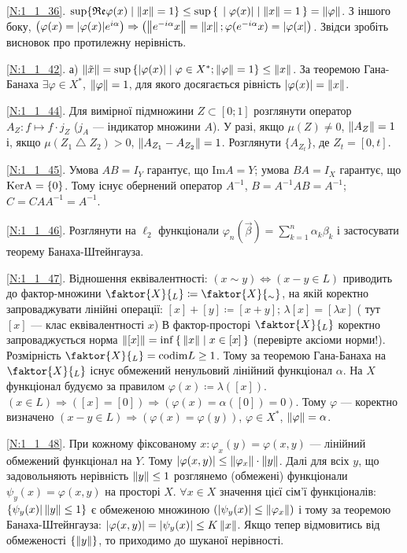 \noindent\ref{N:1_1_36}. $\sup\{\mathfrak{Re}\varphi(x) \mid \left\lVert x\right\rVert = 1\} \leq
\sup\set{ |\varphi(x)| \mid \left\lVert x\right\rVert=1 } = \left\lVert\varphi\right\rVert$.
З іншого боку, $\left(\varphi(x) = |\varphi(x)| e^{i \alpha}\right) \Rightarrow
\left( \left\lVert e^{-i \alpha}x\right\rVert = \left\lVert x\right\rVert; \varphi(e^{-i \alpha} x) = |\varphi(x| \right)$.
Звідси зробіть висновок про протилежну нерівність.

\noindent\ref{N:1_1_42}. а) $\left\lVert\tilde{x}\right\rVert = \sup\left\{|\varphi(x)| \mid
\varphi\in X^*; \left\lVert\varphi\right\rVert=1\right\} \leq \left\lVert x\right\rVert$. За теоремою Гана-Банаха 
$\exists\varphi\in X^*$, $\left\lVert\varphi\right\rVert = 1$, для якого досягається рівність
$|\varphi(x)| = \left\lVert x\right\rVert$.

\noindent\ref{N:1_1_44}. Для вимірної підмножини $Z \subset [0; 1]$ розглянути оператор
$A_Z: f \mapsto f \cdot j_Z$ ($j_A$ --- індикатор множини $A$). У разі, якщо $\mu(Z) \neq 0$, 
$\left\lVert A_Z\right\rVert = 1$ і, якщо $\mu (Z_1 \bigtriangleup Z_2) > 0$, $\left\lVert A_{Z_1} - A_{Z_2}\right\rVert = 1$.
Розглянути $\{A_{Z_t}\}$, де $Z_t = [0, t]$.

\noindent\ref{N:1_1_45}. Умова $AB = I_Y$ гарантує, що $\mathrm{Im} A = Y$; умова $BA = I_X$
гарантує, що $\rm KerA = \{0\}$. Тому існує обернений оператор $A^{-1}$, $B = A^{-1}AB = A^{-1}$; $C = CAA^{-1} = A^{-1}$.

\noindent\ref{N:1_1_46}. Розглянути на $\ell_2$ функціонали $\varphi_n (\vec{\beta}) = \sum\limits_{k = 1}^{n} \alpha_k \beta_k$
і застосувати теорему Банаха-Штейнгауза.

\noindent\ref{N:1_1_47}. Відношення еквівалентності: $(x \sim y) \Leftrightarrow (x - y \in L)$
приводить до фактор-множини $\faktor{X}{_L} \coloneqq \faktor{X}{_\sim}$, на якій коректно запроваджувати
лінійні операції: $[x] + [y] \coloneqq [x+y]$; $\lambda [x] = [\lambda x]$ ( тут $[x]$ --- клас еквівалентності $x$)
В фактор-просторі $\faktor{X}{_L}$ коректно запроваджується норма $\left\lVert[x]\right\rVert = \inf\set{\left\lVert x\right\rVert \mid x \in [x]}$
(перевірте аксіоми норми!). Розмірність $\faktor{X}{_L} = \mathrm{codim} L \geq 1$. Тому за теоремою
Гана-Банаха на $\faktor{X}{_L}$ існує обмежений ненульовий лінійний функціонал $\alpha$.
На $X$ функціонал будуємо за правилом $\varphi(x) \coloneqq \lambda([x])$.
$(x \in L) \Rightarrow ([x] = [0]) \Rightarrow (\varphi(x) = \alpha([0]) = 0)$.
Тому $\varphi$ --- коректно визначено $(x-y \in L) \Rightarrow (\varphi(x) = \varphi(y))$,
$\varphi \in X^*$, $\left\lVert\varphi\right\rVert = \alpha$.

\noindent\ref{N:1_1_48}. При кожному фіксованому $x: \varphi_x(y) = \varphi(x, y)$ --- лінійний обмежений функціонал на $Y$. Тому
$|\varphi(x, y)| \leq \left\lVert\varphi_x\right\rVert \cdot \left\lVert y\right\rVert$. Далі для всіх $y$, що задовольняють нерівність $\left\lVert y\right\rVert \leq 1$
розглянемо (обмежені) функціонали $\psi_y (x) = \varphi(x, y)$ на просторі $X$. $\forall x \in X$ значення цієї
сім'ї функціоналів: $\{\psi_y (x) | \left\lVert y\right\rVert \leq 1\}$ є обмеженою множиною $(|\psi_y(x)| \leq \left\lVert\varphi_x\right\rVert)$ і тому за теоремою
Банаха-Штейнгауза: $|\varphi(x, y)| = |\psi_y(x)| \leq K\left\lVert x\right\rVert$. Якщо тепер відмовитись від обмеженості $\{\left\lVert y\right\rVert\}$, то приходимо до
шуканої нерівності.

